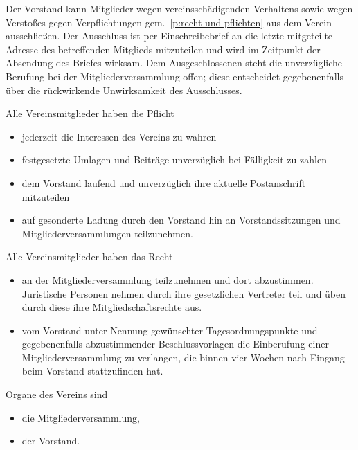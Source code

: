 \documentclass[fontsize=11pt,pagesize,parskip=half]{scrartcl}
\begin{document}
\begin{contract}
Der Vorstand kann Mitglieder wegen vereinsschädigenden Verhaltens sowie wegen Verstoßes gegen Verpflichtungen gem.~\ref{p:recht-und-pflichten} aus dem Verein ausschließen.
Der Ausschluss ist per Einschreibebrief an die letzte mitgeteilte Adresse des betreffenden Mitglieds mitzuteilen und wird im Zeitpunkt der Absendung des Briefes wirksam.
Dem Ausgeschlossenen steht die unverzügliche Berufung bei der Mitgliederversammlung offen; diese entscheidet gegebenenfalls über die rückwirkende Unwirksamkeit des Ausschlusses.

\label{p:recht-und-pflichten}

Alle Vereinsmitglieder haben die Pflicht
\begin{itemize}
\item jederzeit die Interessen des Vereins zu wahren
\item festgesetzte Umlagen und Beiträge unverzüglich bei Fälligkeit zu zahlen
\item dem Vorstand laufend und unverzüglich ihre aktuelle Postanschrift mitzuteilen
\item auf gesonderte Ladung durch den Vorstand hin an Vorstandssitzungen und Mitgliederversammlungen teilzunehmen.
\end{itemize}

Alle Vereinsmitglieder haben das Recht
\begin{itemize}
\item an der Mitgliederversammlung teilzunehmen und dort abzustimmen. Juristische Personen nehmen durch ihre gesetzlichen Vertreter teil und üben durch diese ihre Mitgliedschaftsrechte aus.
\item vom Vorstand unter Nennung gewünschter Tagesordnungspunkte und gegebenenfalls abzustimmender Beschlussvorlagen die Einberufung einer Mitgliederversammlung zu verlangen, die binnen vier Wochen nach Eingang beim Vorstand stattzufinden hat.
\end{itemize}



Organe des Vereins sind
\begin{itemize}
\item die Mitgliederversammlung,
\item der Vorstand.
\end{itemize}


\end{contract}
\end{document}
